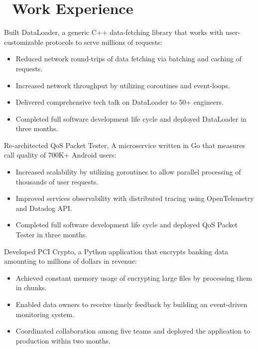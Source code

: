 \documentclass{resume}
\begin{document}
\section{\faUsers\ Work Experience}
Built DataLoader, a generic C++ data-fetching library that works with user-customizable protocols to serve millions of requests:
\begin{itemize}
  \item {Reduced network round-trips of data fetching via batching and caching of requests.}
  \item {Increased network throughput by utilizing coroutines and event-loops.}
  \item {Delivered comprehensive tech talk on DataLoader to 50+ engineers.}
  \item {Completed full software development life cycle and deployed DataLoader in three months.}
\end{itemize}

Re-architected QoS Packet Tester, A microservice written in Go that measures call quality of 700K+ Android users:
\begin{itemize}
  \item {Increased scalability by utilizing goroutines to allow parallel processing of thousands of user requests.}
  \item {Improved services observability with distributed tracing using OpenTelemetry and Datadog API.}
  \item {Completed full software development life cycle and deployed QoS Packet Tester in three months.}
\end{itemize}

Developed PCI Crypto, a Python application that encrypts banking data amounting to millions of dollars in revenue:
\begin{itemize}
  \item {Achieved constant memory usage of encrypting large files by processing them in chunks.}
  \item {Enabled data owners to receive timely feedback by building an event-driven monitoring system.}
  \item {Coordinated collaboration among five teams and deployed the application to production within two months.}
\end{itemize}
\end{document}
